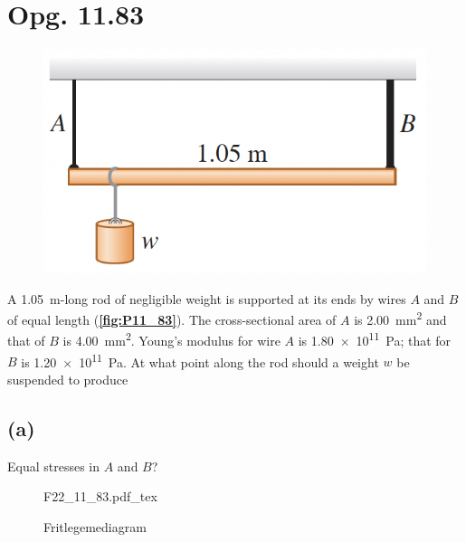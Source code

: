 \documentclass[12pt]{article}
\newcommand{\incfig}[2][1]{%
  \def\svgwidth{#1\columnwidth}
  {#2.pdf_tex}
}
\theoremstyle{definition}
\begin{document}
\section*{Opg. 11.83}
\begin{figure} [ht]
  \centering
  \caption{}
  \includegraphics[width=0.5\linewidth]{../figures/P11_83.png}
  \label{fig:P11_83}
\end{figure}

A \qty{1,05}{m}-long rod of negligible weight is supported at its ends by wires $A$ and $B$ of equal length (\textbf{\autoref{fig:P11_83}}). The cross-sectional area of $A$ is \qty{2,00}{mm^2} and that of $B$ is \qty{4,00}{mm^2}. Young’s modulus for wire $A$ is \qty{1,80e11}{Pa}; that for $B$ is \qty{1,20e11}{Pa}. At what point along the rod should a weight $w$ be suspended to produce

\subsection*{(a)}
Equal stresses in $A$ and $B$?
\bigbreak
\begin{figure}[ht]
  \centering
  \incfig[0.8]{F22_11_83}
  \caption{Fritlegemediagram}
  \label{fig:F22_11_83}
\end{figure}
\end{document}
